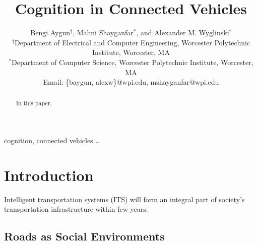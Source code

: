 \documentclass[journal, 11pt]{IEEEtran}
\begin{document}
\title{Cognition in Connected Vehicles}

\author{Bengi Aygun$^\dag$, Mahni Shayganfar$^*$, and Alexander M. Wyglinski$^\dag$\\
\normalsize $^\dag$Department of Electrical and Computer Engineering, Worcester Polytechnic Institute, Worcester, MA\\
\normalsize $^*$Department of Computer Science, Worcester Polytechnic Institute, Worcester, MA\\
\normalsize Email: \{baygun, alexw\}@wpi.edu, mshayganfar@wpi.edu}

\maketitle

\begin{abstract}
In this paper,
\end{abstract}

\begin{keywords}
cognition, connected vehicles \ldots
\end{keywords}%

\IEEEpeerreviewmaketitle
\section{Introduction}
%
Intelligent transportation systems (ITS) will form an integral part of society's
transportation infrastructure within few years.

\subsection{Roads as Social Environments}
\end{document}
